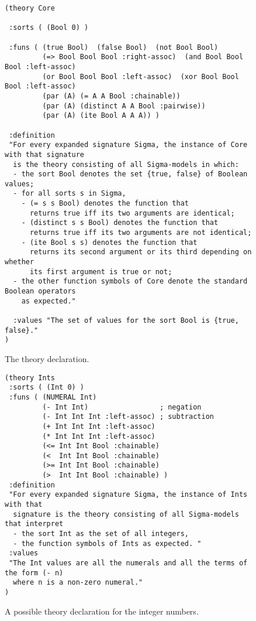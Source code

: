 \begin{figure}[t]
\small
{\color{NavyBlue}
\begin{verbatim}
(theory Core

 :sorts ( (Bool 0) )

 :funs ( (true Bool)  (false Bool)  (not Bool Bool)
         (=> Bool Bool Bool :right-assoc)  (and Bool Bool Bool :left-assoc)
         (or Bool Bool Bool :left-assoc)  (xor Bool Bool Bool :left-assoc)
         (par (A) (= A A Bool :chainable))
         (par (A) (distinct A A Bool :pairwise))
         (par (A) (ite Bool A A A)) )

 :definition
 "For every expanded signature Sigma, the instance of Core with that signature
  is the theory consisting of all Sigma-models in which: 
  - the sort Bool denotes the set {true, false} of Boolean values;
  - for all sorts s in Sigma, 
    - (= s s Bool) denotes the function that
      returns true iff its two arguments are identical;
    - (distinct s s Bool) denotes the function that
      returns true iff its two arguments are not identical;
    - (ite Bool s s) denotes the function that
      returns its second argument or its third depending on whether 
      its first argument is true or not;
  - the other function symbols of Core denote the standard Boolean operators
    as expected."
  
  :values "The set of values for the sort Bool is {true, false}." 
)
\end{verbatim}
}%
\caption{The  theory declaration.}
\label{fig:Core}
\end{figure}


\begin{figure}[t]
\small
{\color{NavyBlue}
\begin{verbatim}
(theory Ints
 :sorts ( (Int 0) )
 :funs ( (NUMERAL Int) 
         (- Int Int)                 ; negation
         (- Int Int Int :left-assoc) ; subtraction
         (+ Int Int Int :left-assoc) 
         (* Int Int Int :left-assoc)
         (<= Int Int Bool :chainable)
         (<  Int Int Bool :chainable)
         (>= Int Int Bool :chainable)
         (>  Int Int Bool :chainable) )
 :definition 
 "For every expanded signature Sigma, the instance of Ints with that
  signature is the theory consisting of all Sigma-models that interpret 
  - the sort Int as the set of all integers,
  - the function symbols of Ints as expected. "
 :values 
 "The Int values are all the numerals and all the terms of the form (- n)
  where n is a non-zero numeral." 
)
\end{verbatim}
}
\caption{A possible theory declaration for the integer numbers.}
\label{fig:Integers}
\end{figure}


